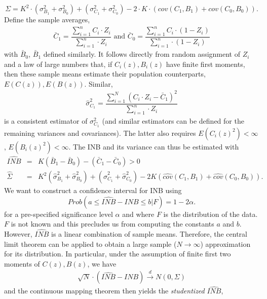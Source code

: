 \documentclass[english, 11pt,a4paper, ]{article}
\begin{document}
\begin{equation}
\Sigma= K^2\cdot(\sigma^2_{B_1} + \sigma^2_{B_0}) + (\sigma^2_{C_1} + \sigma^2_{C_0}) -2\cdot K\cdot(cov(C_1,B_1) + cov(C_0,B_0)).
\end{equation}
Define the sample averages,
\begin{align}
	\bar{C}_1=\dfrac{\sum_{i=1}^n C_i \cdot Z_i}{\sum_{i=1}^n \cdot Z_i} \text{ and } \bar{C}_0=\dfrac{\sum_{i=1}^n C_i \cdot (1-Z_i)}{\sum_{i=1}^n \cdot (1-Z_i)}
\end{align}
with $\bar{B}_0 $, $\bar{B}_1$ defined similarly. It follows directly from random assignment of $Z_i$ and a law of large numbers that, if $C_i(z), B_i(z)$ have finite first moments, then these sample means estimate their population counterparts, $E(C(z)), E(B(z))$. Similar,
\begin{align}
	\hat{\sigma}^2_{C_1}=\dfrac{\sum_{i=1}^N \left(C_i \cdot Z_i - \bar{C}_1\right)^2}{{\sum_{i=1}^n \cdot Z_i} }
\end{align}
is a consistent estimator of $\sigma^2_{C_1}$ (and similar estimators can be defined for the remaining variances and covariances). The latter also requires $E(C_i(z)^2)<\infty$, $E(B_i(z)^2)<\infty$. The INB and its variance can thus be estimated with   
\begin{eqnarray}
\widehat{INB} &=&  K(\bar{B}_1-\bar{B}_0) - (\bar{C}_1-\bar{C}_0)   >0  \\
\hat{\Sigma}&=& K^2(\hat{\sigma}^2_{B_1} + \hat{\sigma}^2_{B_0}) + (\hat{\sigma}^2_{C_1} + \hat{\sigma}^2_{C_0}) -2K(\widehat{cov}(C_1,B_1) + \widehat{cov}(C_0,B_0)).
\end{eqnarray}
We want to construct a confidence interval for INB using
\begin{equation}
Prob(a\leq \widehat{INB}-INB\leq b|F) = 1- 2\alpha.
\end{equation}
for a pre-specified significance level $ \alpha $ and where $ F $ is the distribution of the data. $ F $ is not known and this precludes us from computing the constants $a$ and $b$. However,  $ \widehat{INB} $ is a linear combination of sample means. Therefore, the central limit theorem can be applied to obtain a large sample ($ N\rightarrow\infty $) approximation for its distribution. In particular, under the assumption of finite first two moments of $C(z), B(z)$, we have
\begin{eqnarray}
\sqrt{N}\cdot (\widehat{INB}-INB)\xrightarrow{d} N(0, \Sigma)
\end{eqnarray}
and the continuous mapping theorem then yields the \textit{studentized} $ \widehat{INB} $, 
\end{document}
